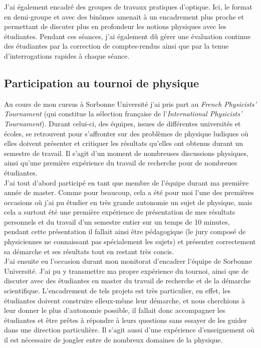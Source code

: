 \documentclass[a4paper,11pt]{article} %
\newcommand{\pointmedian}{\fontfamily{cmr}\selectfont\textperiodcentered}
\begin{document}
	J'ai également encadré des groupes de travaux pratiques d'optique. Ici, le format en demi-groupe et avec des binômes amenait à un encadrement plus proche et permettant de discuter plus en profondeur les notions physiques avec les étudiant\pointmedian es. Pendant ces séances, j'ai également dû gérer une évaluation continue des étudiant\pointmedian es par la correction de comptes-rendus ainsi que par la tenue d'interrogations rapides à chaque séance.\\
	
	\subsection{Participation au tournoi de physique}
	Au cours de mon cursus à Sorbonne Université j'ai pris part au \textit{French Physicists' Tournament} (qui constitue la sélection française de l'\textit{International Physicists' Tournament}). Durant celui-ci, des équipes, issues de différentes universités et écoles, se retrouvent pour \textgravedbl s'affronter\textacutedbl{} sur des problèmes de physique ludiques où elles doivent présenter et critiquer les résultats qu'elles ont obtenus durant un semestre de travail. Il s'agit d'un moment de nombreuses discussions physiques, ainsi qu'une première expérience du travail de recherche pour de nombreu\pointmedian es étudiant\pointmedian es.\\
	
	J'ai tout d'abord participé en tant que membre de l'équipe durant ma première année de master. Comme pour beaucoup, cela a été pour moi l'une des premières occasions où j'ai pu étudier en très grande autonomie un sujet de physique, mais cela a surtout été une première expérience de présentation de mes résultats personnels et du travail d'un semestre entier sur un temps de 10 minutes, pendant cette présentation il fallait ainsi être pédagogique (le jury composé de physicien\pointmedian nes ne connaissant pas spécialement les sujets) et présenter correctement sa démarche et ses résultats tout en restant très concis.\\
	
	J'ai ensuite eu l'occasion durant mon monitorat d'encadrer l'équipe de Sorbonne Université. J'ai pu y transmettre ma propre expérience du tournoi, ainsi que de discuter avec des étudiant\pointmedian es en master du travail de recherche et de la démarche scientifique. L'encadrement de tels projets est très particulier, en effet, les étudiant\pointmedian es doivent construire elleux-même leur démarche, et nous cherchions à leur donner le plus d'autonomie possible, il fallait donc accompagner les étudiant\pointmedian es et être prêt\pointmedian es à répondre à leurs questions sans essayer de les guider dans une direction particulière. Il s'agit aussi d'une expérience d'enseignement où il est nécessaire de jongler entre de nombreux domaines de la physique.\\
	
\end{document}
